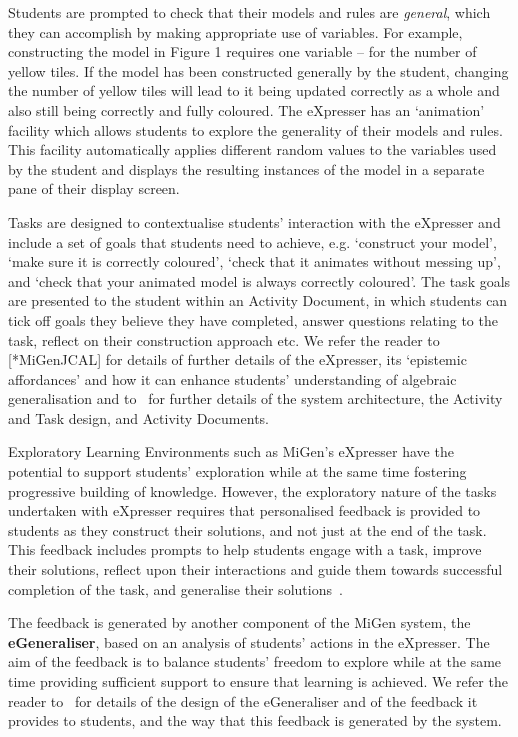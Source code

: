 Students are prompted to check that their models and rules are {\em
  general}, which they can accomplish by making appropriate use of
variables. For example, constructing the model in Figure 1 requires
one variable – for the number of yellow tiles. If the model has been
constructed generally by the student, changing the number of yellow
tiles will lead to it being updated correctly as a whole and also
still being correctly and fully coloured. The eXpresser has an
`animation' facility which allows students to explore the generality
of their models and rules. This facility automatically applies
different random values to the variables used by the student and
displays the resulting instances of the model in a separate pane of
their display screen.  

Tasks are designed to contextualise students' interaction with the
eXpresser and include a set of goals that students need to achieve,
e.g. `construct your model', `make sure it is correctly coloured',
`check that it animates without messing up', and `check that your
animated model is always correctly coloured'. The task goals are
presented to the student within an Activity Document, in which
students can tick off goals they believe they have completed, answer
questions relating to the task, reflect on their construction approach
etc. We refer the reader to [*MiGenJCAL] for details of 
further details of the eXpresser, its `epistemic
affordances' and how it can enhance
 students’ understanding of algebraic generalisation and to~\cite{MiGen-CAE} for further details
of the system architecture, the Activity and Task design, and Activity Documents.  

Exploratory Learning Environments such as MiGen's eXpresser
have the potential to support students' exploration while at the same
time fostering progressive building of knowledge. However, the
exploratory nature of the tasks undertaken with eXpresser requires
that personalised feedback is provided to students as they construct
their solutions, and not just at the end of the task. This feedback
includes prompts to help students engage with a task, improve their
solutions, reflect upon their interactions and guide them towards
successful completion of the task, and generalise their 
solutions~\cite{MiGen-CAE,relevantPapersOnIntSupport}. 

The feedback is generated by another
component of the MiGen system, the {\bf eGeneraliser}, based on an
analysis of students’ actions in the eXpresser. %
%
The aim of the
feedback is to balance students' freedom to explore while at the same
time providing sufficient support to ensure that learning is
achieved. We refer the reader to~\cite{relevantPapersOnIntSupport} for
details of the design of the eGeneraliser and of the feedback it
provides to students, and the way that this feedback is generated by
the system.  

